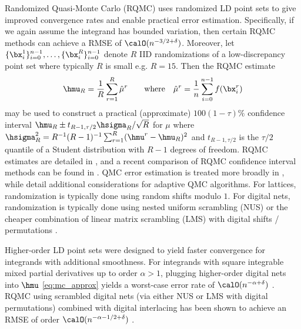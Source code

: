 \documentclass[acmsmall]{acmart}
\begin{document}
Randomized Quasi-Monte Carlo (RQMC) uses randomized LD point sets to give improved convergence rates and enable practical error estimation. Specifically, if we again assume the integrand has bounded variation, then certain RQMC methods can achieve a RMSE of $\calO(n^{-3/2+\delta})$. Moreover, let $\{\bx_i^1\}_{i=0}^{n-1}, \dots, \{\bx_i^R\}_{i=0}^{n-1}$ denote $R$ IID randomizations of a low-discrepancy point set where typically $R$ is small e.g. $R=15$. Then the RQMC estimate 
\begin{equation}
    \hmu_R = \frac{1}{R} \sum_{r=1}^R \hat{\mu}^r \qquad \text{where} \quad \hat{\mu}^r = \frac{1}{n} \sum_{i=0}^{n-1} f(\bx_i^r)
    \label{eq:RQMC}
\end{equation}
may be used to construct a practical (approximate) $100(1-\tau)\%$ confidence interval $\hmu_R \pm t_{R-1,\tau/2} \hsigma_R/\sqrt{R}$ for $\mu$ where $\hsigma_R^2 = R^{-1}(R-1)^{-1} \sum_{r=1}^R (\hmu^r - \hmu_R)^2$ and $t_{R-1,\tau/2}$ is the $\tau/2$ quantile of a Student distribution with $R-1$ degrees of freedom. RQMC estimates are detailed in \citep[Chapter 17]{owen.mc_book}, and a recent comparison of RQMC confidence interval methods can be found in \citep{l2023confidence}.  QMC error estimation is treated more broadly in \citep{owen2024error}, while \citep{clancy2014cost,adaptive_qmc,clancy2014cost} detail additional considerations for adaptive QMC algorithms. For lattices, randomization is typically done using random shifts modulo $1$. For digital nets, randomization is typically done using nested uniform scrambling (NUS) or the cheaper combination of linear matrix scrambling (LMS) with digital shifts / permutations \citep{owen.variance_alternative_scrambles_digital_net,owen_halton,owen.gain_coefficients_scrambled_halton}.

Higher-order LD point sets were designed to yield faster convergence for integrands with additional smoothness. For integrands with square integrable mixed partial derivatives up to order $\alpha>1$, plugging higher-order digital nets into $\hmu$ \eqref{eq:mc_approx} yields a worst-case error rate of $\calO(n^{-\alpha+\delta})$ \citep{dick.walsh_spaces_HO_nets,dick.qmc_HO_convergence_MCQMC2008,dick.decay_walsh_coefficients_smooth_functions}. RQMC using scrambled digital nets (via either NUS or LMS with digital permutations) combined with digital interlacing has been shown to achieve an RMSE of order $\calO(n^{-\alpha-1/2+\delta})$ \citep{dick.higher_order_scrambled_digital_nets}. %
\end{document}

